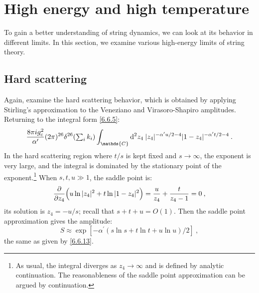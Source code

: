 \section{High energy and high temperature} \label{sec:9.8}

To gain a better understanding of string dynamics, we can look at its behavior in different limits. In this section, we examine various high-energy limits of string theory.

\subsection*{Hard scattering}

Again, examine the hard scattering behavior, which is obtained by applying Stirling's approximation to the Veneziano and Virasoro-Shapiro amplitudes.
Returning to the integral form \eqref{6.6.5}:
\begin{equation}
	\frac{8 \pi \mi g_{\mathrm{c}}^{2}}{\alpha^{\prime}} (2\pi)^{26} \delta^{26}({\textstyle \sum_{i} k_{i}}) 
	\int_{\mathds{C}} \dif^{2} z_{4} \: |z_{4}|^{-\alpha^{\prime}u/2 - 4}|1-z_{4}|^{-\alpha^{\prime} t/2 - 4} \:.
	\label{9.8.1}
\end{equation}
In the hard scattering region where $t/s$ is kept fixed and $s \rightarrow \infty$, the exponent is very large, and the integral is dominated by the stationary point of the exponent.\footnote{As usual, the integral diverges as $z_{4}\to \infty$ and is defined by analytic continuation. The reasonableness of the saddle point approximation can be argued by continuation.} When $s, t, u \gg 1$, the saddle point is:
\begin{equation}
	\frac{\partial}{\partial z_{4}}\Bigl(u \ln |z_{4}|^{2}+t \ln |1-z_{4}|^{2}\Bigr) = 
	\frac{u}{z_{4}} + \frac{t}{z_{4}-1} = 0 \:, \label{9.8.2}
\end{equation}
its solution is $z_{4} = -u/s$;
recall that $s+t+u=O(1)$. Then the saddle point approximation gives the amplitude:
\begin{equation}
	S \approx \exp [-\alpha^{\prime}(s \ln s + t \ln t + u \ln u) / 2] \:, \label{9.8.3}
\end{equation}
the same as given by \eqref{6.6.13}.
